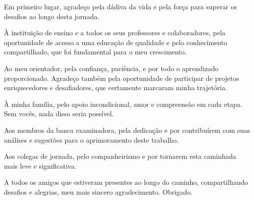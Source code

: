 \begin{agradecimentos}
  Em primeiro lugar, agradeço pela dádiva da vida e pela força para superar os desafios ao longo desta jornada.

  À instituição de ensino e a todos os seus professores e colaboradores, pela oportunidade de acesso a uma educação de qualidade e pelo conhecimento compartilhado, que foi fundamental para o meu crescimento.

  Ao meu orientador, pela confiança, paciência, e por todo o aprendizado proporcionado. Agradeço também pela oportunidade de participar de projetos enriquecedores e desafiadores, que certamente marcaram minha trajetória.

  À minha família, pelo apoio incondicional, amor e compreensão em cada etapa. Sem vocês, nada disso seria possível.

  Aos membros da banca examinadora, pela dedicação e por contribuírem com suas análises e sugestões para o aprimoramento deste trabalho.

  Aos colegas de jornada, pelo companheirismo e por tornarem esta caminhada mais leve e significativa.

  A todos os amigos que estiveram presentes ao longo do caminho, compartilhando desafios e alegrias, meu mais sincero agradecimento. Obrigado.
\end{agradecimentos}
